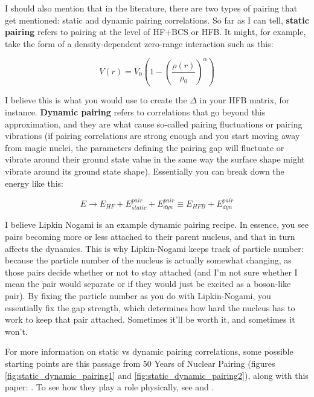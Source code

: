 I should also mention that in the literature, there are two types of pairing that get mentioned: static and dynamic pairing correlations. So far as I can tell, \textbf{static pairing} refers to pairing at the level of HF+BCS or HFB. It might, for example, take the form of a density-dependent zero-range interaction such as this:

\begin{equation*}
V(r) = V_0\left(1-\left(\frac{\rho(r)}{\rho_0}\right)^\alpha\right)
\end{equation*}

\noindent I believe this is what you would use to create the $\Delta$ in your HFB matrix, for instance. \textbf{Dynamic pairing} refers to correlations that go beyond this approximation, and they are what cause so-called pairing fluctuations or pairing vibrations (if pairing correlations are strong enough and you start moving away from magic nuclei, the parameters defining the pairing gap will fluctuate or vibrate around their ground state value in the same way the surface shape might vibrate around its ground state shape). Essentially you can break down the energy like this:

\begin{equation*}
E \rightarrow E_{HF} + E^{pair}_{static} + E^{pair}_{dyn} \equiv E_{HFB} + E^{pair}_{dyn}
\end{equation*}

I believe Lipkin Nogami is an example dynamic pairing recipe. In essence, you see pairs becoming more or less attached to their parent nucleus, and that in turn affects the dynamics. This is why Lipkin-Nogami keeps track of particle number: because the particle number of the nucleus is actually somewhat changing, as those pairs decide whether or not to stay attached (and I'm not sure whether I mean the pair would separate or if they would just be excited as a boson-like pair). By fixing the particle number as you do with Lipkin-Nogami, you essentially fix the gap strength, which determines how hard the nucleus has to work to keep that pair attached. Sometimes it'll be worth it, and sometimes it won't.

For more information on static vs dynamic pairing correlations, some possible starting points are this passage from 50 Years of Nuclear Pairing (figures \ref{fig:static_dynamic_pairing1} and \ref{fig:static_dynamic_pairing2}), along with this paper: \cite{SHIMIZU1990c477}. To see how they play a role physically, see \cite{SHIMIZU198733} and \cite{MORETTO19721}.


